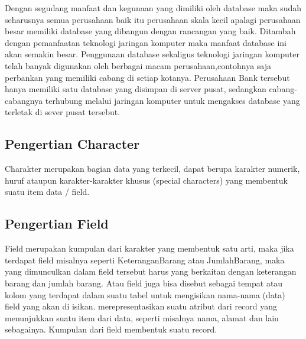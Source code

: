 	Dengan segudang manfaat dan kegunaan yang dimiliki oleh database maka sudah seharusnya semua perusahaan baik itu perusahaan skala kecil apalagi perusahaan besar memiliki database yang dibangun dengan rancangan yang baik. Ditambah dengan pemanfaatan teknologi jaringan komputer maka manfaat database ini akan semakin besar. Penggunaan database sekaligus teknologi jaringan komputer telah banyak digunakan oleh berbagai macam perusahaan,contohnya saja perbankan yang memiliki cabang di setiap kotanya. Perusahaan Bank tersebut hanya memiliki satu database yang disimpan di server pusat, sedangkan cabang-cabangnya terhubung melalui jaringan komputer untuk mengakses database yang terletak di sever pusat tersebut.

\subsection{Pengertian Character}
Charakter merupakan bagian data yang terkecil, dapat berupa karakter numerik, huruf ataupun karakter-karakter khusus (special characters) yang membentuk suatu item data / field.

\subsection{Pengertian Field} 
Field merupakan kumpulan dari karakter yang membentuk satu arti, maka jika terdapat field misalnya seperti KeteranganBarang atau JumlahBarang, maka yang dimunculkan dalam field tersebut harus yang berkaitan dengan keterangan barang dan jumlah barang. Atau field juga bisa disebut sebagai tempat atau kolom yang terdapat dalam suatu tabel untuk mengisikan nama-nama (data) field yang akan di isikan. merepresentasikan suatu atribut dari record yang menunjukkan suatu item dari data, seperti misalnya nama, alamat dan lain sebagainya. Kumpulan dari field membentuk suatu record.


